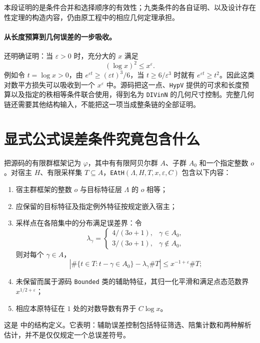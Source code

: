 本段证明的是条件合并和选择顺序的有效性；九类条件的各自证明、以及设计存在性定理的构造内容，仍由原工程中的相应几何定理承担。

\paragraph{从长度预算到几何误差的一步吸收。}
 还明确证明：当 $\varepsilon>0$ 时，充分大的 $x$ 满足
\[
(\log x)^2\le x^\varepsilon.
\]
例如令 $t=\log x>0$，由 $e^{\varepsilon t}\ge(\varepsilon t)^3/6$，当 $t\ge6/\varepsilon^3$ 时就有 $e^{\varepsilon t}\ge t^2$。因此这类对数平方损失可以吸收到一个 $x^\varepsilon$ 中。源码把这一点、\texttt{HypV} 提供的可求和长度预算以及指定的秩相等条件联合使用，得到名为 \texttt{DIVinN} 的几何尺寸控制。完整几何链还需要其他结构输入，不能把这一项当成整条链的全部证明。

\section{显式公式误差条件究竟包含什么}
\label{sec:arith-eath}
把源码的有限群框架记为 $\varphi$，其中有有限阿贝尔群 $A$、子群 $A_0$ 和一个指定整数 $o$。对宿主 $H$、有限采样集 $T\subseteq A$，\texttt{EAtH}$(\Lambda,H,T,x,\varepsilon,C)$ 包含以下内容：
\begin{enumerate}
\item 宿主群框架的整数 $o$ 与目标特征层 $\Lambda$ 的 $o$ 相等；
\item 应保留的目标特征及指定例外特征按规定嵌入宿主；
\item 采样点在各陪集中的分布满足误差界：令
\[
\lambda_\gamma=
\begin{cases}
4/(3o+1),&\gamma\in A_0,\\
3/(3o+1),&\gamma\notin A_0,
\end{cases}
\]
则对每个 $\gamma\in A$，
\begin{equation}
\left|\#\{t\in T:t-\gamma\in A_0\}-\lambda_\gamma\#T\right|
\le x^{-1+\varepsilon}\#T;
\label{eq:arith-shares}
\end{equation}
\item 未保留而属于源码 \texttt{Bounded} 类的辅助特征，其归一化平滑和满足点态范数界 $x^{1/2+\varepsilon}$；
\item 相应本原特征在 $1$ 处的对数导数有界于 $C\log x$。
\end{enumerate}
这是  中的结构定义。它表明：辅助误差控制包括特征筛选、陪集计数和两种解析估计，并不是仅仅规定一个总误差符号。

